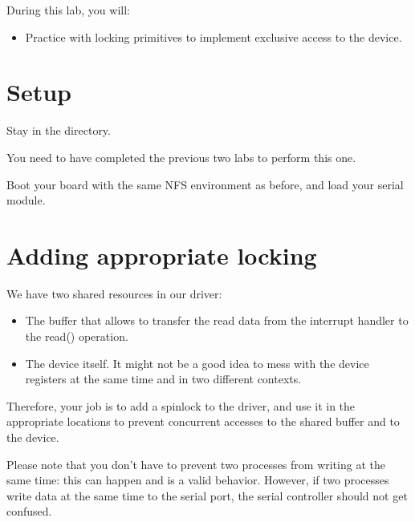 
During this lab, you will:

\begin{itemize}
\item Practice with locking primitives to implement exclusive access
  to the device.
\end{itemize}

\section{Setup}

Stay in the  directory.

You need to have completed the previous two labs to perform this one.

Boot your board with the same NFS environment as before, and load your
serial module.

\section{Adding appropriate locking}

We have two shared resources in our driver:
\begin{itemize}

\item The buffer that allows to transfer the read data from the
  interrupt handler to the read() operation.

\item The device itself. It might not be a good idea to mess with the
  device registers at the same time and in two different contexts.

\end{itemize}

Therefore, your job is to add a spinlock to the driver, and use it in
the appropriate locations to prevent concurrent accesses to the shared
buffer and to the device.

Please note that you don't have to prevent two processes from writing
at the same time: this can happen and is a valid behavior. However, if
two processes write data at the same time to the serial port, the
serial controller should not get confused.
